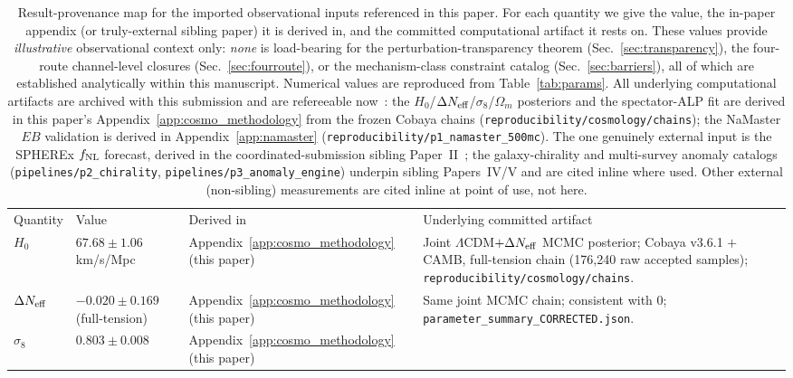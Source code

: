 \documentclass[aps,prd,twocolumn,superscriptaddress,showpacs,preprintnumbers,nofootinbib,longbibliography,floatfix]{revtex4-2}
\newcommand{\Neff}{N_{\rm eff}}
\newcommand{\fnl}{f_{\rm NL}}
\begin{document}
\begin{table}[tb]
\caption{\label{tab:companion_inputs} Result-provenance map for the imported
observational inputs referenced in this paper. For each quantity we give the
value, the in-paper appendix (or truly-external sibling paper) it is derived in,
and the committed computational artifact it rests on. These values provide
\emph{illustrative} observational context only: \emph{none} is load-bearing for
the perturbation-transparency theorem (Sec.~\ref{sec:transparency}), the
four-route channel-level closures (Sec.~\ref{sec:fourroute}), or the
mechanism-class constraint catalog (Sec.~\ref{sec:barriers}), all of which are
established analytically within this manuscript. Numerical values are reproduced
from Table~\ref{tab:params}. All underlying computational artifacts are archived
with this submission and are refereeable now~\cite{BigBounceRepro}: the
$H_0$/$\Delta\Neff$/$\sigma_8$/$\Omega_m$ posteriors and the spectator-ALP fit
are derived in this paper's Appendix~\ref{app:cosmo_methodology} from the frozen
Cobaya chains (\texttt{reproducibility/cosmology/chains}); the NaMaster $EB$
validation is derived in Appendix~\ref{app:namaster}
(\texttt{reproducibility/p1\_namaster\_500mc}). The one genuinely external input
is the SPHEREx $\fnl$ forecast, derived in the coordinated-submission sibling
Paper~II~\cite{Golden2026P2}; the galaxy-chirality and multi-survey anomaly
catalogs (\texttt{pipelines/p2\_chirality}, \texttt{pipelines/p3\_anomaly\_engine})
underpin sibling Papers~IV/V and are cited inline where used. Other external
(non-sibling) measurements are cited inline at point of use, not here.}
\begin{ruledtabular}
\begin{tabular}{llll}
Quantity & Value & Derived in & Underlying committed artifact \\
\colrule
$H_0$ & $67.68\pm 1.06$ km/s/Mpc & Appendix~\ref{app:cosmo_methodology} (this paper) &
\parbox[t]{0.34\textwidth}{\raggedright Joint $\Lambda$CDM$+\Delta\Neff$ MCMC
posterior; Cobaya v3.6.1 $+$ CAMB, full-tension chain (176{,}240 raw accepted
samples); \texttt{reproducibility/cosmology/chains}.\strut} \\[3pt]
$\Delta\Neff$ & $-0.020\pm 0.169$ (full-tension) & Appendix~\ref{app:cosmo_methodology} (this paper) &
\parbox[t]{0.34\textwidth}{\raggedright Same joint MCMC chain; consistent with
$0$; \texttt{parameter\_summary\_CORRECTED.json}.\strut} \\[3pt]
$\sigma_8$ & $0.803\pm 0.008$ & Appendix~\ref{app:cosmo_methodology} (this paper) &

\end{tabular}
\end{ruledtabular}
\end{table}
\end{document}
